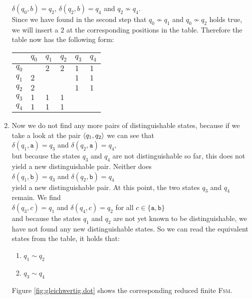 \begin{enumerate}
      $\delta(q_0,b) = q_2$, \quad $\delta(q_2,b) = q_4$ \quad and \quad $q_2 \not\sim q_4$.
      \\[0.2cm]
      Since we have found in the second step that $q_0 \not\sim q_1$ and $q_0 \not\sim q_2$ holds true, we will insert a $2$ at the corresponding positions in the table. Therefore the table now has the following form:
      \begin{center}        
      \begin{tabular}[t]{|l||l|l|l|l|l|}
      \hline
        & $q_0$      &      $q_1$ &      $q_2$ &      $q_3$ &      $q_4$  \\
      \hline
      \hline
      $q_0$ &          &$2$ &$2$ &$1$ &$1$  \\
      \hline
      $q_1$ &$2$ &          &          &$1$ &$1$  \\
      \hline
      $q_2$ &$2$ &          &          &$1$ &$1$  \\
      \hline
      $q_3$ &$1$ &$1$ &$1$ &          &           \\
      \hline
      $q_4$ &$1$ &$1$ &$1$ &          &           \\
      \hline
      \end{tabular}
      \end{center}
\item Now we do not find any more pairs of distinguishable states, because if we take a look at the pair $\pair(q_1,q_2)$ we can see that
      \\[0.2cm]
      \hspace*{1.3cm}
      $\delta(q_1,\texttt{a}) = q_3$ \quad and \quad $\delta(q_2,\texttt{a}) = q_4$, 
      \\[0.2cm]
      but because the states $q_3$ and $q_4$ are not distinguishable so far, this does not yield a new
      distinguishable pair.  Neither does 
      \\[0.2cm]
      \hspace*{1.3cm}
      $\delta(q_1,\texttt{b}) = q_3$ \quad and \quad $\delta(q_2,\texttt{b}) = q_4$
      \\[0.2cm]
      yield a new distinguishable pair.  At this point, the two states $q_3$ and $q_4$ remain.  We find
      \\[0.2cm]
      \hspace*{1.3cm}
      $\delta(q_3,c) = q_1$ \quad and \quad $\delta(q_4,c) = q_2$ \quad for all $c \in \{\texttt{a}, \texttt{b}\}$
      \\[0.2cm]
      and because the states $q_1$ and $q_2$ are not yet known to be distinguishable, we have not found any new distinguishable states.
      So we can read the equivalent states from the table, it holds that:
      \begin{enumerate}
      \item $q_1 \sim q_2$
      \item $q_3 \sim q_4$
      \end{enumerate}
      Figure \ref{fig:gleichwertig.dot} shows the corresponding reduced finite \textsc{Fsm}.
\end{enumerate}


